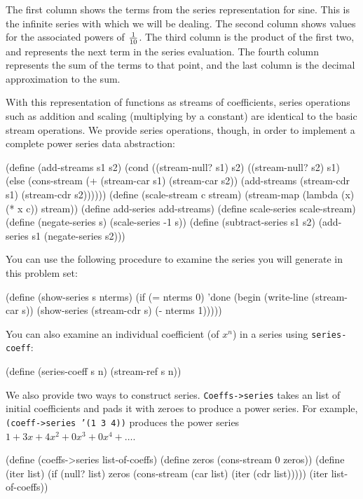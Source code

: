 The first column shows the terms from the series representation for
sine.  This is the infinite series with which we will be dealing.  The
second column shows values for the associated powers of ${1 \over 10}$.
The third column is the product of the first two, and represents the
next term in the series evaluation.  The fourth column represents the
sum of the terms to that point, and the last column is the decimal
approximation to the sum.

With this representation of functions as streams of coefficients,
series operations such as addition and scaling (multiplying by a
constant) are identical to the basic stream operations.  We provide
series operations, though, in order to implement a complete power
series data abstraction:

\beginlisp
(define (add-streams s1 s2)
  (cond ((stream-null? s1) s2)
        ((stream-null? s2) s1)
        (else
         (cons-stream (+ (stream-car s1) (stream-car s2))
                      (add-streams (stream-cdr s1)
                                   (stream-cdr s2))))))
\null
(define (scale-stream c stream)
  (stream-map (lambda (x) (* x c)) stream))
\null
(define add-series add-streams)
\null
(define scale-series scale-stream)
\null
(define (negate-series s)
  (scale-series -1 s))
\null
(define (subtract-series s1 s2)
  (add-series s1 (negate-series s2)))
\endlisp

\noindent You can use the following procedure to examine the series you will
generate in this problem set:

\beginlisp
(define (show-series s nterms)
  (if (= nterms 0)
      'done
      (begin (write-line (stream-car s))
             (show-series (stream-cdr s) (- nterms 1)))))
\endlisp

\noindent
You can also examine an individual coefficient (of $x^n$) in a series
using {\tt series-coeff}:

\beginlisp
(define (series-coeff s n)
  (stream-ref s n))
\endlisp        

We also provide two ways to construct series.  {\tt Coeffs->series}
takes an list of initial coefficients and pads it with zeroes to
produce a power series.  For example, {\tt (coeff->series '(1 3 4))}
produces the power series $1+3x+4x^2+0x^3+0x^4+\ldots{}$.

\beginlisp
(define (coeffs->series list-of-coeffs)
  (define zeros (cons-stream 0 zeros))
  (define (iter list)
    (if (null? list)
        zeros
        (cons-stream (car list)
                     (iter (cdr list)))))
  (iter list-of-coeffs))
\endlisp

